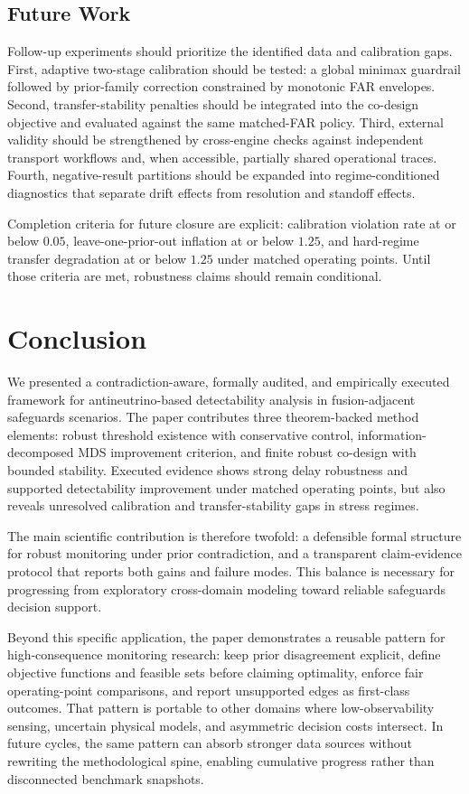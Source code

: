 \subsection{Future Work}
Follow-up experiments should prioritize the identified data and calibration gaps. First, adaptive two-stage calibration should be tested: a global minimax guardrail followed by prior-family correction constrained by monotonic FAR envelopes. Second, transfer-stability penalties should be integrated into the co-design objective and evaluated against the same matched-FAR policy. Third, external validity should be strengthened by cross-engine checks against independent transport workflows and, when accessible, partially shared operational traces. Fourth, negative-result partitions should be expanded into regime-conditioned diagnostics that separate drift effects from resolution and standoff effects.

Completion criteria for future closure are explicit: calibration violation rate at or below $0.05$, leave-one-prior-out inflation at or below $1.25$, and hard-regime transfer degradation at or below $1.25$ under matched operating points. Until those criteria are met, robustness claims should remain conditional.

\section{Conclusion}\label{sec:conclusion}
We presented a contradiction-aware, formally audited, and empirically executed framework for antineutrino-based detectability analysis in fusion-adjacent safeguards scenarios. The paper contributes three theorem-backed method elements: robust threshold existence with conservative control, information-decomposed MDS improvement criterion, and finite robust co-design with bounded stability. Executed evidence shows strong delay robustness and supported detectability improvement under matched operating points, but also reveals unresolved calibration and transfer-stability gaps in stress regimes.

The main scientific contribution is therefore twofold: a defensible formal structure for robust monitoring under prior contradiction, and a transparent claim-evidence protocol that reports both gains and failure modes. This balance is necessary for progressing from exploratory cross-domain modeling toward reliable safeguards decision support.

Beyond this specific application, the paper demonstrates a reusable pattern for high-consequence monitoring research: keep prior disagreement explicit, define objective functions and feasible sets before claiming optimality, enforce fair operating-point comparisons, and report unsupported edges as first-class outcomes. That pattern is portable to other domains where low-observability sensing, uncertain physical models, and asymmetric decision costs intersect. In future cycles, the same pattern can absorb stronger data sources without rewriting the methodological spine, enabling cumulative progress rather than disconnected benchmark snapshots.

\clearpage{}\label{sec:end_of_main}
